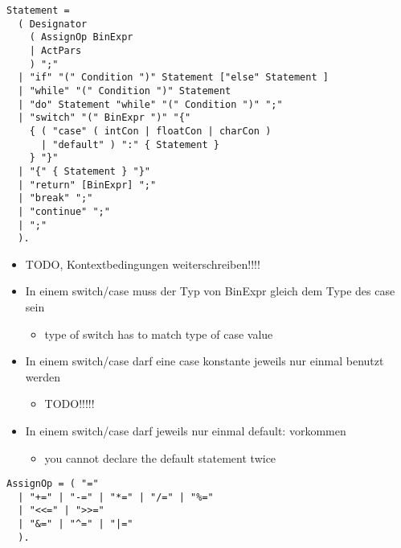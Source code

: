 \begin{samepage}
\begin{lstlisting}[language=EBNF]
Statement = 
  ( Designator
    ( AssignOp BinExpr 
    | ActPars
    ) ";" 
  | "if" "(" Condition ")" Statement ["else" Statement ]
  | "while" "(" Condition ")" Statement
  | "do" Statement "while" "(" Condition ")" ";"
  | "switch" "(" BinExpr ")" "{" 
  	{ ( "case" ( intCon | floatCon | charCon )
  	  | "default" ) ":" { Statement } 
  	} "}"
  | "{" { Statement } "}"
  | "return" [BinExpr] ";"
  | "break" ";"
  | "continue" ";"
  | ";"
  ).
\end{lstlisting}
\begin{itemize}
  \item TODO, Kontextbedingungen weiterschreiben!!!!
  \item In einem switch/case muss der Typ von BinExpr gleich dem Type des case sein
  \begin{itemize}
    \item type of switch has to match type of case value
  \end{itemize}
  \item In einem switch/case darf eine case konstante jeweils nur einmal benutzt werden
  \begin{itemize}
    \item TODO!!!!!
  \end{itemize}
  \item In einem switch/case darf jeweils nur einmal default: vorkommen
  \begin{itemize}
    \item you cannot declare the default statement twice
  \end{itemize}
\end{itemize}
\end{samepage}


\begin{samepage}
\begin{lstlisting}[language=EBNF]
AssignOp = ( "=" 
  | "+=" | "-=" | "*=" | "/=" | "%=" 
  | "<<=" | ">>=" 
  | "&=" | "^=" | "|=" 
  ). 
\end{lstlisting}
\end{samepage}


